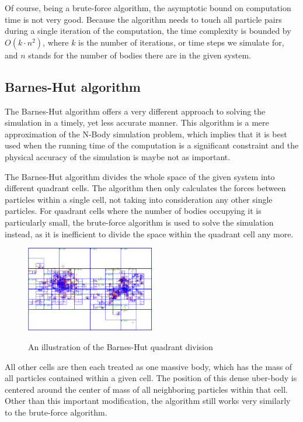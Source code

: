 \documentclass[journal]{IEEEtran}
\begin{document}
			Of course, being a brute-force algorithm, the asymptotic bound on computation time is not very good. Because the algorithm needs to touch all particle pairs during a single iteration of the computation, the time complexity is bounded by $O(k \cdot n^2)$, where $k$ is the number of iterations, or time steps we simulate for, and $n$ stands for the number of bodies there are in the given system.
		
	\subsection*{Barnes-Hut algorithm}
	\label{barnes}
		
		The Barnes-Hut algorithm offers a very different approach to solving the simulation in a timely, yet less accurate manner. This algorithm is a mere approximation of the N-Body simulation problem, which implies that it is best used when the running time of the computation is a significant constraint and the physical accuracy of the simulation is maybe not as important.
	
		The Barnes-Hut algorithm divides the whole space of the given system into different quadrant cells. The algorithm then only calculates the forces between particles within a single cell, not taking into consideration any other single particles. For quadrant cells where the number of bodies occupying it is particularly small, the brute-force algorithm is used to solve the simulation instead, as it is inefficient to divide the space within the quadrant cell any more.
	
	\begin{figure}[ht]
		\centering
		\includegraphics[width=0.5\textwidth]{barneshut.png}
		\caption{\label{cells}An illustration of the Barnes-Hut quadrant division}
		\cite{barnespic}
	\end{figure}
	
		All other cells are then each treated as one massive body, which has the mass of all particles contained within a given cell. The position of this dense uber-body is centered around the center of mass of all neighboring particles within that cell. Other than this important modification, the algorithm still works very similarly to the brute-force algorithm. 
		
\end{document}
